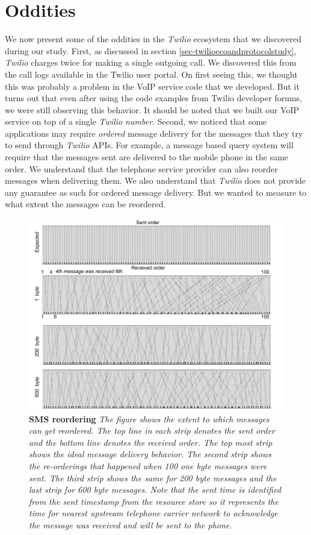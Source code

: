 \section{Oddities}
\label{sec-oddities}

We now present some of the oddities in the \textit{Twilio} ecosystem that we discovered during our study. First, as discussed in section \ref{sec-twilioecoandprotocolstudy}, \textit{Twilio} charges twice for making a single outgoing call. We discovered this from the call logs available in the Twilio user portal. On first seeing this, we thought this was probably a problem in the VoIP service code that we developed. But it turns out that even after using the code examples from Twilio developer forums, we were still observing this behavior. It should be noted that we built our VoIP service on top of a single \textit{Twilio number}. Second, we noticed that some applications may require \textit{ordered} message delivery for the messages that they try to send through \textit{Twilio} APIs. For example, a message based query system will require that the messages sent are delivered to the mobile phone in the same order. We understand that the telephone service provider can also reorder messages when delivering them. We also understand that \textit{Twilio} does not provide any guarantee as such for ordered message delivery. But we wanted to measure to what extent the messages can be reordered. 

\begin{figure}[t!] \centering
\includegraphics[width=\textwidth]{figs/reordering.pdf}
\caption{\textbf{SMS reordering} {\footnotesize\textit{
The figure shows the extent to which messages can get reordered. The top line in each strip denotes the sent order and the bottom line denotes the received order. The top most strip shows the ideal message delivery behavior. The second strip shows the re-orderings that happened when 100 one byte messages were sent. The third strip shows the same for 200 byte messages and the last strip for 600 byte messages. Note that the sent time is identified from the \textit{sent timestamp} from the resource store so it represents the time for nearest upstream telephone carrier network to acknowledge the message was received and will be sent to the phone. 
}}}
\label{fig:reordering}
\end{figure}


